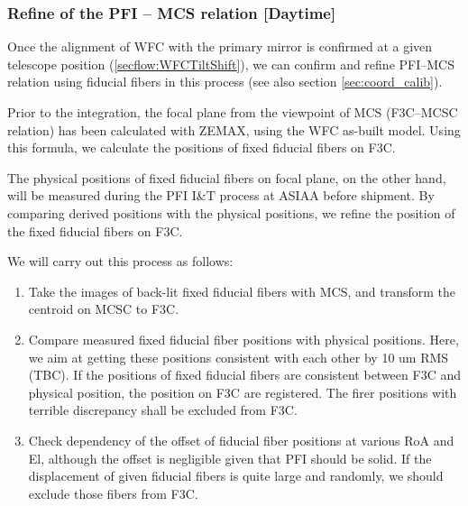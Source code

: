 \subsubsection{Refine of the PFI -- MCS relation [Daytime]}\label{secflow:mcs2f3c}
Once the alignment of WFC with the primary mirror is confirmed at a given telescope position (\ref{secflow:WFCTiltShift}), we can confirm and refine PFI--MCS relation using fiducial fibers in this process (see also section \ref{sec:coord_calib}).

Prior to the integration, the focal plane from the viewpoint of MCS (F3C--MCSC relation) has been calculated with ZEMAX, using the WFC as-built model.
Using this formula, we calculate the positions of fixed fiducial fibers on F3C.

The physical positions of fixed fiducial fibers on focal plane, on the other hand, will be measured during the PFI I\&T process at ASIAA before shipment.
By comparing derived positions with the physical positions, we refine the position of the fixed fiducial fibers on F3C.

We will carry out this process as follows:
\begin{enumerate}
\item Take the images of back-lit fixed fiducial fibers with MCS, and transform the centroid on MCSC to F3C.
\item Compare measured fixed fiducial fiber positions with physical positions.
Here, we aim at getting these positions consistent with each other by 10 um RMS (TBC).
If the positions of fixed fiducial fibers are consistent between F3C and physical position, the position on F3C are registered.
The firer positions with terrible discrepancy shall be excluded from F3C.
\item Check dependency of the offset of fiducial fiber positions at various RoA and El, although the offset is negligible given that PFI should be solid.
If the displacement of given fiducial fibers is quite large and randomly, we should exclude those fibers from F3C.

\end{enumerate}

